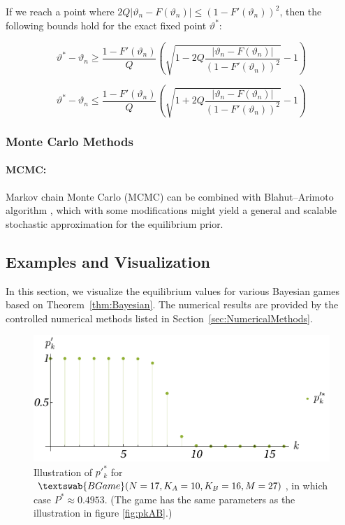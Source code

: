 \documentclass{article}
\theoremstyle{definition}
\newcommand{\BG}[1]{$\textswab{BGame}(#1)$}
\begin{document}
If we reach a point where $2 Q |\vartheta_n-F(\vartheta_n)| \le \left ( 1- F'(\vartheta_n)\right )^2$, then the following bounds hold for the exact fixed point $\vartheta^*$:

\begin{equation}
    \vartheta^* - \vartheta_n \ge \frac{1-F'(\vartheta_n)}{Q} \left ( \sqrt{1- 2 Q \frac{|\vartheta_n-F(\vartheta_n)|}{\left ( 1- F'(\vartheta_n)\right )^2}} 
    -1
    \right ) 
\end{equation}

\begin{equation}
    \vartheta^* - \vartheta_n \le \frac{1-F'(\vartheta_n)}{Q} \left ( \sqrt{1+ 2 Q \frac{|\vartheta_n-F(\vartheta_n)|}{\left ( 1- F'(\vartheta_n)\right )^2}} 
    -1
    \right ) 
\end{equation}

\subsubsection{Monte Carlo Methods}

\paragraph{MCMC:} Markov chain Monte Carlo (MCMC) \cite{book:MCMC} can be combined with Blahut–Arimoto algorithm \cite{paper:MCMCBlahutArimoto,arxiv:MCMCBlahutArimoto}, which with some modifications might yield a general and scalable stochastic approximation for the equilibrium prior.


\subsection{Examples and Visualization}

In this section, we visualize the equilibrium values for various Bayesian games based on Theorem~\ref{thm:Bayesian}.
The numerical results are provided by 
the controlled numerical methods listed in Section~\ref{sec:NumericalMethods}.

\begin{figure}[H]
    \centering
    \includegraphics[scale=0.8]{img/ppkAB17_10_16_27.pdf}
    \caption{Illustration of $p'^*_k$ for \BG{N=17,K_A=10,K_B=16,M=27}, in which case $P^*\approx 0.4953$. (The game has the same parameters as the illustration in figure \ref{fig:pkAB}.)}
    \label{fig:ppkAB}
\end{figure}
\end{document}
